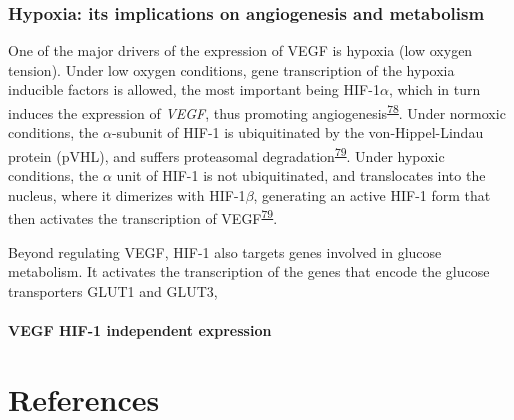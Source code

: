 \documentclass[11pt]{umnthesis}
\begin{document}
\hypertarget{hypoxia-its-implications-on-angiogenesis-and-metabolism}{%
\subsubsection{Hypoxia: its implications on angiogenesis and metabolism}\label{hypoxia-its-implications-on-angiogenesis-and-metabolism}}

One of the major drivers of the expression of VEGF is hypoxia (low oxygen tension). Under low oxygen conditions, gene transcription of the hypoxia inducible factors is allowed, the most important being HIF-1\(\alpha\), which in turn induces the expression of \emph{VEGF}, thus promoting angiogenesis\textsuperscript{\protect\hyperlink{ref-simon2017}{78}}. Under normoxic conditions, the \(\alpha\)-subunit of HIF-1 is ubiquitinated by the von-Hippel-Lindau protein (pVHL), and suffers proteasomal degradation\textsuperscript{\protect\hyperlink{ref-tirpe2019}{79}}. Under hypoxic conditions, the \(\alpha\) unit of HIF-1 is not ubiquitinated, and translocates into the nucleus, where it dimerizes with HIF-1\(\beta\), generating an active HIF-1 form that then activates the transcription of VEGF\textsuperscript{\protect\hyperlink{ref-tirpe2019}{79}}.

Beyond regulating VEGF, HIF-1 also targets genes involved in glucose metabolism. It activates the transcription of the genes that encode the glucose transporters GLUT1 and GLUT3,

\hypertarget{vegf-hif-1-independent-expression}{%
\paragraph{VEGF HIF-1 independent expression}\label{vegf-hif-1-independent-expression}}

\hypertarget{references}{%
\section{References}\label{references}}
\end{document}
